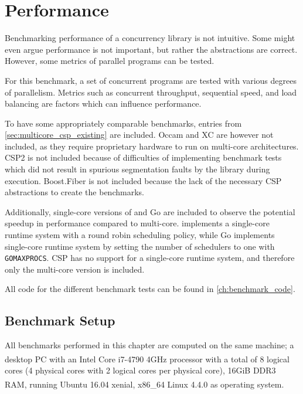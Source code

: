 
\chapter{Performance}
\label{ch:performance}


Benchmarking performance of a concurrency library is not intuitive. Some might even argue performance is not important, but rather the abstractions are correct. However, some metrics of parallel programs can be tested.

For this benchmark, a set of concurrent programs are tested with various degrees of parallelism. Metrics such as concurrent throughput, sequential speed, and load balancing are factors which can influence performance.

To have some appropriately comparable benchmarks, entries from \cref{sec:multicore_csp_existing} are included. Occam and XC are however not included, as they require proprietary hardware to run on multi\hyp{}core architectures. \Cpp{}CSP2 is not included because of difficulties of implementing benchmark tests which did not result in spurious segmentation faults by the library during execution. Boost.Fiber is not included because the lack of the necessary CSP abstractions to create the benchmarks.

Additionally, single\hyp{}core versions of \Proxc{} and Go are included to observe the potential speedup in performance compared to multi\hyp{}core. \Proxc{} implements a single\hyp{}core runtime system with a round robin scheduling policy, while Go implements single\hyp{}core runtime system by setting the number of schedulers to one with \texttt{GOMAXPROCS}. \Cpp{}CSP has no support for a single\hyp{}core runtime system, and therefore only the multi\hyp{}core version is included.

All code for the different benchmark tests can be found in \cref{ch:benchmark_code}.


\section{Benchmark Setup}
\label{sec:benchmark_setup}


All benchmarks performed in this chapter are computed on the same machine; a desktop PC with an Intel\textsuperscript{\textregistered} Core\textsuperscript{\texttrademark} i7-4790 4GHz processor with a total of 8 logical cores (4 physical cores with 2 logical cores per physical core), 16GiB DDR3 RAM, running Ubuntu\textsuperscript{\textregistered} 16.04 xenial, x86\_64 Linux\textsuperscript{\textregistered} 4.4.0 as operating system.

